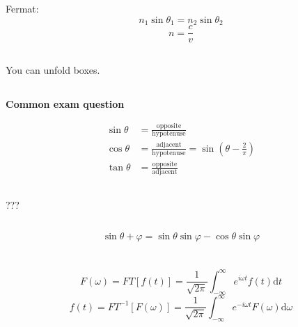 \documentclass[12pt]{report}
\newcommand{\vphi}{\varphi}
\newcommand{\dd}{\mathrm{d}}
\newcommand{\exam}{\begin{center}
\textbf{Common exam question}
\end{center}}
\begin{document}
\section{}

\subsection{}
Fermat:
\[n_1\sin\theta_1=n_2\sin\theta_2\]
\[n=\frac{c}{v}\]

\subsection{}
You can unfold boxes.

\subsection{}
\exam
\begin{align*}
\sin\theta&=\mathrm{\frac{opposite}{hypotenuse}}\\
\cos\theta&=\mathrm{\frac{adjacent}{hypotenuse}}=\sin\left(\theta-\frac{2}{\pi}\right)\\
\tan\theta&=\mathrm{\frac{opposite}{adjacent}}
\end{align*}

\subsection{}
???

\subsection{}
\[\sin\theta+\vphi=\sin\theta\sin\vphi-\cos\theta\sin\vphi\]

\section{}

\subsection{}
\[F(\omega)=FT[f(t)]=\frac{1}{\sqrt{2\pi}}\int_{-\infty}^\infty e^{i\omega t}f(t)\dd t\]
\[f(t)=FT^{-1}[F(\omega)]=\frac{1}{\sqrt{2\pi}}\int_{-\infty}^\infty e^{-i\omega t}F(\omega)\dd\omega\]

\subsection{}
\end{document}
